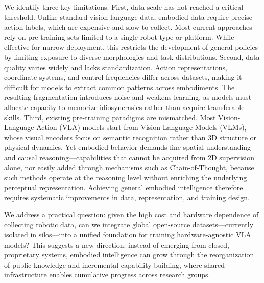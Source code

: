 We identify three key limitations. First, data scale has not reached a critical threshold. Unlike standard vision-language data, embodied data require precise action labels, which are expensive and slow to collect. Most current approaches rely on pre-training sets limited to a single robot type or platform. While effective for narrow deployment, this restricts the development of general policies by limiting exposure to diverse morphologies and task distributions. Second, data quality varies widely and lacks standardization. Action representations, coordinate systems, and control frequencies differ across datasets, making it difficult for models to extract common patterns across embodiments. The resulting fragmentation introduces noise and weakens learning, as models must allocate capacity to memorize idiosyncrasies rather than acquire transferable skills. Third, existing pre-training paradigms are mismatched. Most Vision-Language-Action (VLA) models start from Vision-Language Models (VLMs), whose visual encoders focus on semantic recognition rather than 3D structure or physical dynamics. Yet embodied behavior demands fine spatial understanding and causal reasoning---capabilities that cannot be acquired from 2D supervision alone, nor easily added through mechanisms such as Chain-of-Thought, because such methods operate at the reasoning level without enriching the underlying perceptual representation. Achieving general embodied intelligence therefore requires systematic improvements in data, representation, and training design.

We address a practical question: given the high cost and hardware dependence of collecting robotic data, can we integrate global open-source datasets---currently isolated in silos---into a unified foundation for training hardware-agnostic VLA models? This suggests a new direction: instead of emerging from closed, proprietary systems, embodied intelligence can grow through the reorganization of public knowledge and incremental capability building, where shared infrastructure enables cumulative progress across research groups.

